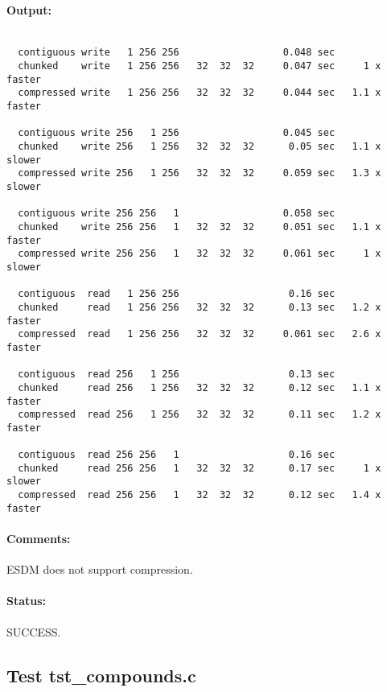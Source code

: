 \paragraph{Output:}

\begin{verbatim}

  contiguous write   1 256 256                  0.048 sec
  chunked    write   1 256 256   32  32  32     0.047 sec     1 x faster
  compressed write   1 256 256   32  32  32     0.044 sec   1.1 x faster

  contiguous write 256   1 256                  0.045 sec
  chunked    write 256   1 256   32  32  32      0.05 sec   1.1 x slower
  compressed write 256   1 256   32  32  32     0.059 sec   1.3 x slower

  contiguous write 256 256   1                  0.058 sec
  chunked    write 256 256   1   32  32  32     0.051 sec   1.1 x faster
  compressed write 256 256   1   32  32  32     0.061 sec     1 x slower

  contiguous  read   1 256 256                   0.16 sec
  chunked     read   1 256 256   32  32  32      0.13 sec   1.2 x faster
  compressed  read   1 256 256   32  32  32     0.061 sec   2.6 x faster

  contiguous  read 256   1 256                   0.13 sec
  chunked     read 256   1 256   32  32  32      0.12 sec   1.1 x faster
  compressed  read 256   1 256   32  32  32      0.11 sec   1.2 x faster

  contiguous  read 256 256   1                   0.16 sec
  chunked     read 256 256   1   32  32  32      0.17 sec     1 x slower
  compressed  read 256 256   1   32  32  32      0.12 sec   1.4 x faster

\end{verbatim}

\paragraph{Comments:} ESDM does not support compression.

\paragraph{Status:} SUCCESS.

\subsection{Test tst\_compounds.c}

